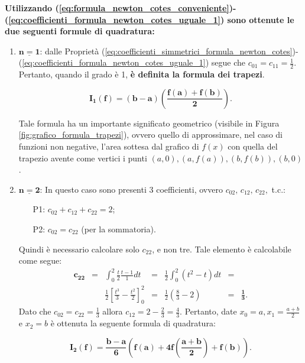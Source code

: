 \textbf{Utilizzando (\ref{eq:formula_newton_cotes_conveniente})-(\ref{eq:coefficienti_formula_newton_cotes_uguale_1}) sono ottenute le due seguenti formule di quadratura:}
\begin{enumerate}
    \item $\boldsymbol{\underline{n=1}}$: dalle Proprietà (\ref{eq:coefficienti_simmetrici_formula_newton_cotes})-(\ref{eq:coefficienti_formula_newton_cotes_uguale_1}) segue che $c_{01}=c_{11}=\frac{1}{2}$. Pertanto, quando il grado è 1, \textbf{è definita la formula dei trapezi}.
   \begin{definition}
   	 \begin{equation}\label{eq:formula_trapezi}
       \boldsymbol{I_1(f)=(b-a)\left(\frac{f(a)+f(b)}{2}\right)}.
    \end{equation}
   \end{definition}
    Tale formula ha un importante significato geometrico (visibile in Figura \ref{fig:grafico_formula_trapezi}), ovvero quello di approssimare, nel caso di funzioni non negative, l'area sottesa dal grafico di $f(x)$ con quella del trapezio avente come vertici i punti $(a,0),(a,f(a)),(b,f(b)),(b,0)$.
    \item $\boldsymbol{\underline{n=2}}$: In questo caso sono presenti 3 coefficienti, ovvero $c_{02},\, c_{12}, \,c_{22},$ t.c.:
    \begin{enumerate}
        \item[P1:] $c_{02}+c_{12}+c_{22}=2$;
        \item[P2:] $c_{02}=c_{22}$ (per la sommatoria).
    \end{enumerate}
    Quindi è necessario calcolare solo $c_{22}$, e non tre. Tale elemento è calcolabile come segue:
    \begin{equation*}
        \begin{matrix}
            \boldsymbol{c_{22}}&=&\int_0^2\frac{t}{2}\frac{t-1}{1}dt&=&\frac{1}{2}\int_0^2(t^2-t)dt&=&\\
            &&\frac{1}{2}\left[\frac{t^3}{3}-\frac{t^2}{2}\right]_0^2&=&\frac{1}{2}\left(\frac{8}{3}-2\right)&=&\boldsymbol{\frac{1}{3}}.
        \end{matrix}
    \end{equation*}
    Dato che $c_{02}=c_{22}=\frac{1}{3}$ allora $c_{12}=2-\frac{2}{3}=\frac{4}{3}$.
    Pertanto, date $x_0=a, x_1=\frac{a+b}{2}$ e $x_2=b$ è ottenuta la seguente formula di quadratura:
	\begin{definition}
		    \begin{equation}\label{eq:formula_simpson}
	        \boldsymbol{I_2(f)=\frac{b-a}{6}\left(f(a)+4f\left(\frac{a+b}{2}\right)+f(b)\right)}.
	    \end{equation}
	\end{definition}
\end{enumerate}

